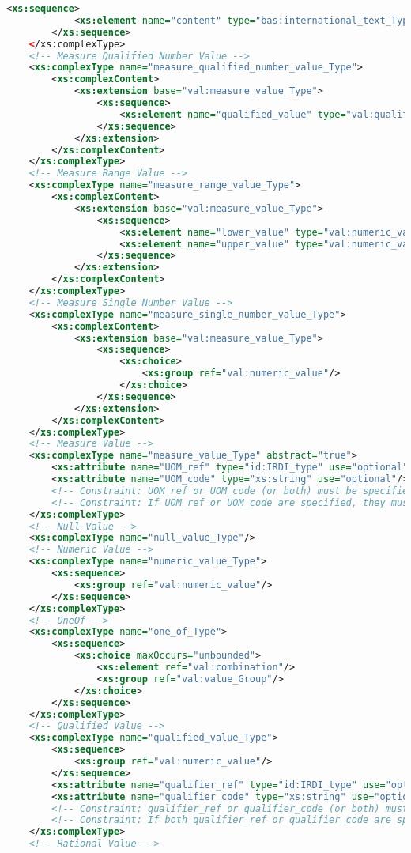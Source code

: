 \begin{lstlisting}[caption=value.xsd, language=XML, label=lst:value_xsd]
		<xs:sequence>
			<xs:element name="content" type="bas:international_text_Type"/>
		</xs:sequence>
	</xs:complexType>
	<!-- Measure Qualified Number Value -->	
	<xs:complexType name="measure_qualified_number_value_Type">
		<xs:complexContent>
			<xs:extension base="val:measure_value_Type">
				<xs:sequence>
					<xs:element name="qualified_value" type="val:qualified_value_Type" maxOccurs="unbounded"/>	
				</xs:sequence>
			</xs:extension>
		</xs:complexContent>
	</xs:complexType>
	<!-- Measure Range Value -->
	<xs:complexType name="measure_range_value_Type">
		<xs:complexContent>
			<xs:extension base="val:measure_value_Type">
				<xs:sequence>
					<xs:element name="lower_value" type="val:numeric_value_Type"/>
					<xs:element name="upper_value" type="val:numeric_value_Type"/>
				</xs:sequence>
			</xs:extension>
		</xs:complexContent>
	</xs:complexType>
	<!-- Measure Single Number Value -->
	<xs:complexType name="measure_single_number_value_Type">
		<xs:complexContent>
			<xs:extension base="val:measure_value_Type">
				<xs:sequence>
					<xs:choice>
						<xs:group ref="val:numeric_value"/>
					</xs:choice>
				</xs:sequence>
			</xs:extension>
		</xs:complexContent>
	</xs:complexType>
	<!-- Measure Value -->
	<xs:complexType name="measure_value_Type" abstract="true">
		<xs:attribute name="UOM_ref" type="id:IRDI_type" use="optional"/>
		<xs:attribute name="UOM_code" type="xs:string" use="optional"/>
		<!-- Constraint: UOM_ref or UOM_code (or both) must be specified. -->
		<!-- Constraint: If UOM_ref or UOM_code are specified, they must denote the same concept. -->
	</xs:complexType>
	<!-- Null Value -->
	<xs:complexType name="null_value_Type"/>
	<!-- Numeric Value -->
	<xs:complexType name="numeric_value_Type">
		<xs:sequence>
			<xs:group ref="val:numeric_value"/>
		</xs:sequence>
	</xs:complexType>
	<!-- OneOf -->
	<xs:complexType name="one_of_Type">
		<xs:sequence>
			<xs:choice maxOccurs="unbounded">
				<xs:element ref="val:combination"/>
				<xs:group ref="val:value_Group"/>
			</xs:choice>
		</xs:sequence>
	</xs:complexType>
	<!-- Qualified Value -->
	<xs:complexType name="qualified_value_Type">
		<xs:sequence>
			<xs:group ref="val:numeric_value"/>
		</xs:sequence>
		<xs:attribute name="qualifier_ref" type="id:IRDI_type" use="optional"/>
		<xs:attribute name="qualifier_code" type="xs:string" use="optional"/>
		<!-- Constraint: qualifier_ref or qualifier_code (or both) must be specified. -->
		<!-- Constraint: If both qualifier_ref or qualifier_code are specified, they must denote the same concept. -->
	</xs:complexType>
	<!-- Rational Value -->

\end{lstlisting}
